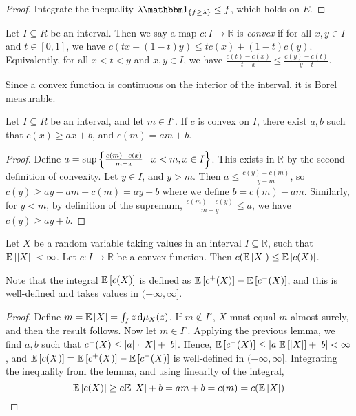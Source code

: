 \begin{proof}
	Integrate the inequality \( \lambda \mathbbm 1_{\qty{f \geq \lambda}} \leq f \), which holds on \( E \).
\end{proof}
\begin{definition}
	Let \( I \subseteq R \) be an interval.
	Then we say a map \( c \colon I \to \mathbb R \) is \emph{convex} if for all \( x, y \in I \) and \( t \in [0,1] \), we have \( c(tx + (1-t)y) \leq tc(x) + (1-t)c(y) \).
	Equivalently, for all \( x < t < y \) and \( x, y \in I \), we have \( \frac{c(t) - c(x)}{t-x} \leq \frac{c(y) - c(t)}{y-t} \).
\end{definition}
Since a convex function is continuous on the interior of the interval, it is Borel measurable.
\begin{lemma}
	Let \( I \subseteq R \) be an interval, and let \( m \in I^\circ \).
	If \( c \) is convex on \( I \), there exist \( a, b \) such that \( c(x) \geq ax + b \), and \( c(m) = am + b \).
\end{lemma}
\begin{proof}
	Define \( a = \sup \qty{\frac{c(m) - c(x)}{m - x} \mid x < m, x \in I} \).
	This exists in \( \mathbb R \) by the second definition of convexity.
	Let \( y \in I \), and \( y > m \).
	Then \( a \leq \frac{c(y) - c(m)}{y - m} \), so \( c(y) \geq ay - am + c(m) = ay + b \) where we define \( b = c(m) - am \).
	Similarly, for \( y < m \), by definition of the supremum, \( \frac{c(m) - c(y)}{m - y} \leq a \), we have \( c(y) \geq ay + b \).
\end{proof}
\begin{theorem}
	Let \( X \) be a random variable taking values in an interval \( I \subseteq \mathbb R \), such that \( \mathbb{E}\left[{\abs{X}}\right] < \infty \).
	Let \( c \colon I \to \mathbb R \) be a convex function.
	Then \( c(\mathbb{E}\left[{X}\right]) \leq \mathbb{E}\left[{c(X)}\right] \).
\end{theorem}
Note that the integral \( \mathbb{E}\left[{c(X)}\right] \) is defined as \( \mathbb{E}\left[{c^+(X)}\right] - \mathbb{E}\left[{c^-(X)}\right] \), and this is well-defined and takes values in \( (-\infty, \infty] \).
\begin{proof}
	Define \( m = \mathbb{E}\left[{X}\right] = \int_I z \dd{\mu_X(z)} \).
	If \( m \not\in I^\circ \), \( X \) must equal \( m \) almost surely, and then the result follows.
	Now let \( m \in I^\circ \).
	Applying the previous lemma, we find \( a, b \) such that \( c^-(X) \leq \abs{a} \cdot \abs{X} + \abs{b} \).
	Hence, \( \mathbb{E}\left[{c^-(X)}\right] \leq \abs{a} \mathbb{E}\left[{\abs{X}}\right] + \abs{b} < \infty \), and \( \mathbb{E}\left[{c(X)}\right] = \mathbb{E}\left[{c^+(X)}\right] - \mathbb{E}\left[{c^-(X)}\right] \) is well-defined in \( (-\infty,\infty] \).
	Integrating the inequality from the lemma, and using linearity of the integral,
	\[ \mathbb{E}\left[{c(X)}\right] \geq a \mathbb{E}\left[{X}\right] + b = am + b = c(m) = c(\mathbb{E}\left[{X}\right]) \]
\end{proof}
